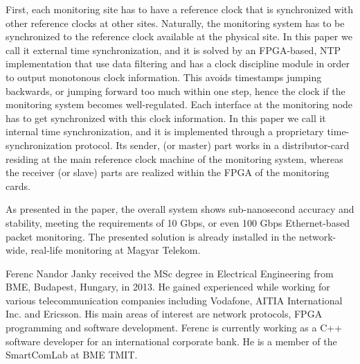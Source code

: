 \documentclass[journal]{IEEEtran}
\begin{document}
First, each monitoring site has to have a reference clock that is synchronized with other reference clocks at other sites. Naturally, the monitoring system has to be synchronized to the reference clock available at the physical site. In this paper we call it external time synchronization, and it is solved by an FPGA-based, NTP implementation that use data filtering and has a clock discipline module in order to output monotonous clock information. This avoids timestamps jumping backwards, or jumping forward too much within one step, hence the clock if the monitoring system becomes well-regulated. Each interface at the monitoring node has to get synchronized with this clock information. In this paper we call it internal time synchronization, and it is implemented through a proprietary time-synchronization protocol. Its sender, (or master) part works in a distributor-card residing at the main reference clock machine of the monitoring system, whereas the receiver (or slave) parts are realized within the FPGA of the monitoring cards.

As presented in the paper, the overall system shows sub-nanosecond accuracy and stability, meeting the requirements of 10 Gbps, or even 100 Gbps Ethernet-based packet monitoring. The presented solution is already installed in the network-wide, real-life monitoring at Magyar Telekom.





\begin{IEEEbiography}{Ferenc Nandor Janky} 
received the MSc degree in Electrical Engineering from BME, Budapest, Hungary, in 2013.
He gained experienced while working for various telecommunication companies including Vodafone, AITIA International Inc. and Ericsson.
His main areas of interest are network protocols, FPGA programming and software development. 
Ferenc is currently working as a C++ software developer for an international corporate bank. He is a member of the SmartComLab at BME TMIT.
\end{IEEEbiography}
\end{document}
